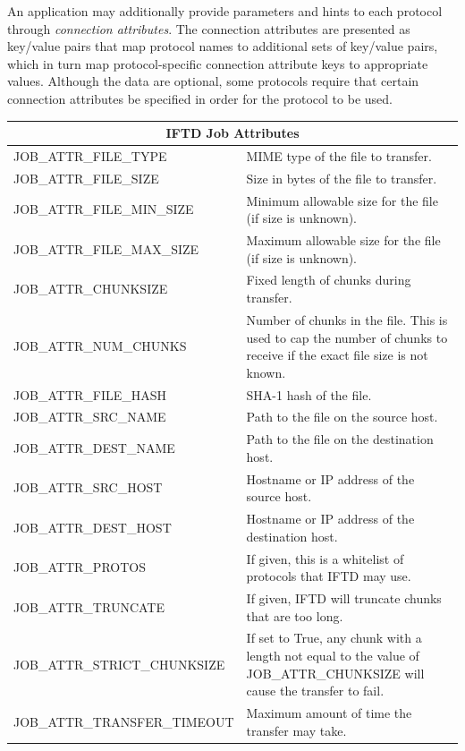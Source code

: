 An application may additionally provide parameters and hints to each protocol through \textit{connection attributes}.  The connection attributes are presented as key/value pairs that map protocol names to additional sets of key/value pairs, which in turn map protocol-specific connection attribute keys to appropriate values.  Although the data are optional, some protocols require that certain connection attributes be specified in order for the protocol to be used.

\begin{table}[ht!]
\label{iftd-job-fields}
\begin{tabular}{ | l | p{10cm} |}
\hline
\multicolumn{2}{|c|}{IFTD Job Attributes} \\
\hline
JOB\_ATTR\_FILE\_TYPE & MIME type of the file to transfer. \\
JOB\_ATTR\_FILE\_SIZE & Size in bytes of the file to transfer. \\
JOB\_ATTR\_FILE\_MIN\_SIZE & Minimum allowable size for the file (if size is unknown). \\
JOB\_ATTR\_FILE\_MAX\_SIZE & Maximum allowable size for the file (if size is unknown). \\
JOB\_ATTR\_CHUNKSIZE & Fixed length of chunks during transfer. \\
JOB\_ATTR\_NUM\_CHUNKS & Number of chunks in the file.  This is used to cap the number of chunks to receive if the exact file size is not known. \\
JOB\_ATTR\_FILE\_HASH & SHA-1 hash of the file. \\
JOB\_ATTR\_SRC\_NAME & Path to the file on the source host. \\
JOB\_ATTR\_DEST\_NAME & Path to the file on the destination host. \\
JOB\_ATTR\_SRC\_HOST & Hostname or IP address of the source host. \\
JOB\_ATTR\_DEST\_HOST & Hostname or IP address of the destination host. \\
JOB\_ATTR\_PROTOS & If given, this is a whitelist of protocols that IFTD may use. \\
JOB\_ATTR\_TRUNCATE & If given, IFTD will truncate chunks that are too long. \\
JOB\_ATTR\_STRICT\_CHUNKSIZE & If set to True, any chunk with a length not equal to the value of JOB\_ATTR\_CHUNKSIZE will cause the transfer to fail. \\
JOB\_ATTR\_TRANSFER\_TIMEOUT & Maximum amount of time the transfer may take. \\

\end{tabular}
\end{table}
